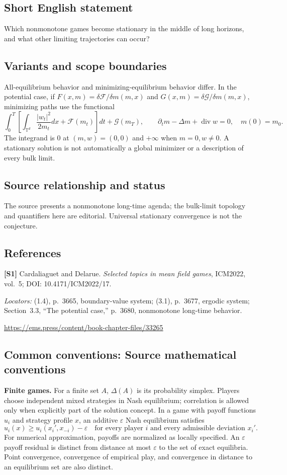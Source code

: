 \documentclass[11pt,a4paper]{article}
\begin{document}
\subsection*{Short English statement}
Which nonmonotone games become stationary in the middle of long horizons, and what other limiting trajectories can occur?
\subsection*{Variants and scope boundaries}
All-equilibrium behavior and minimizing-equilibrium behavior differ. In the potential case, if $F(x,m)=\delta\mathcal F/\delta m(m,x)$ and $G(x,m)=\delta\mathcal G/\delta m(m,x)$, minimizing paths use the functional
\[
 \int_0^T\left[\int_{\mathbb T^d}\frac{|w_t|^2}{2m_t}dx+\mathcal F(m_t)\right]dt
 +\mathcal G(m_T),\qquad
 \partial_t m-\Delta m+\operatorname{div}w=0,\quad m(0)=m_0.
\]
The integrand is $0$ at $(m,w)=(0,0)$ and $+\infty$ when $m=0,w\ne0$. A stationary solution is not automatically a global minimizer or a description of every bulk limit.
\subsection*{Source relationship and status}
The source presents a nonmonotone long-time agenda; the bulk-limit topology and quantifiers here are editorial. Universal stationary convergence is not the conjecture.
\subsection*{References}
\begingroup\footnotesize\raggedright
{\footnotesize\raggedright
\textbf{[S1]} Cardaliaguet and Delarue. \emph{Selected topics in mean field games}, ICM2022, vol.~5; DOI: 10.4171/ICM2022/17.\par
\textit{Locators:} (1.4), p.~3665, boundary-value system; (3.1), p.~3677, ergodic system; Section~3.3, ``The potential case,'' p.~3680, nonmonotone long-time behavior.\par
\url{https://ems.press/content/book-chapter-files/33265}\par}
\par\endgroup

\subsection*{Common conventions: Source mathematical conventions}

\textbf{Finite games.} For a finite set $A$, $\Delta(A)$ is its probability
simplex. Players choose independent mixed strategies in Nash equilibrium;
correlation is allowed only when explicitly part of the solution concept.
In a game with payoff functions $u_i$ and strategy profile $x$, an additive
$\varepsilon$ Nash equilibrium satisfies
\[
 u_i(x)\geq u_i(x_i',x_{-i})-\varepsilon
 \quad\text{for every player $i$ and every admissible deviation $x_i'$}.
\]
For numerical approximation, payoffs are normalized as locally specified.
An $\varepsilon$ payoff residual is distinct from distance at most
$\varepsilon$ to the set of exact equilibria. Point convergence, convergence
of empirical play, and convergence in distance to an equilibrium set are
also distinct.
\end{document}
